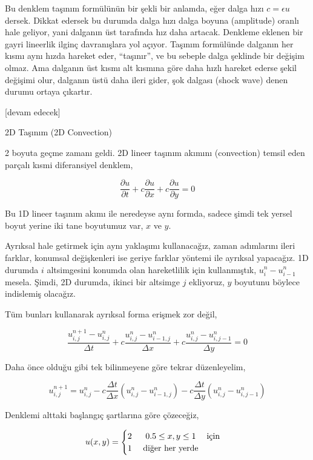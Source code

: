 \documentclass[12pt,fleqn]{article}\usepackage{../../common}
\begin{document}
Bu denklem taşınım formülünün bir şekli bir anlamda, eğer dalga hızı
$c = \epsilon u$ dersek. Dikkat edersek bu durumda dalga hızı dalga boyuna
(amplitude) oranlı hale geliyor, yani dalganın üst tarafında hız daha artacak.
Denkleme eklenen bir gayri lineerlik ilginç davranışlara yol açıyor. Taşınım
formülünde dalganın her kısmı aynı hızda hareket eder, ``taşınır'', ve bu
sebeple dalga şeklinde bir değişim olmaz. Ama dalganın üst kısmı alt kısmına
göre daha hızlı hareket ederse şekil değişimi olur, dalganın üstü daha ileri
gider, şok dalgası (shock wave) denen durumu ortaya çıkartır. 

[devam edecek]

2D Taşınım (2D Convection)

2 boyuta geçme zamanı geldi. 2D lineer taşınım akımını (convection) temsil eden
parçalı kısmi diferansiyel denklem,

$$
\frac{\partial u}{\partial t} +
c\frac{\partial u}{\partial x} +
c\frac{\partial  u}{\partial y} = 0
$$

Bu 1D lineer taşınım akımı ile neredeyse aynı formda, sadece şimdi tek yersel
boyut yerine iki tane boyutumuz var, $x$ ve $y$.

Ayrıksal hale getirmek için aynı yaklaşımı kullanacağız, zaman adımlarını ileri
farklar, konumsal değişkenleri ise geriye farklar yöntemi ile ayrıksal
yapacağız. 1D durumda $i$ altsimgesini konumda olan hareketlilik için
kullanmıştık,  $u_{i}^n-u_{i-1}^n$ mesela. Şimdi, 2D durumda, ikinci bir
altsimge $j$ ekliyoruz, $y$ boyutunu böylece indislemiş olacağız.

Tüm bunları kullanarak ayrıksal forma erişmek zor değil,

$$
\frac{u_{i,j}^{n+1}-u_{i,j}^n}{\Delta t} +
c\frac{u_{i, j}^n-u_{i-1,j}^n}{\Delta x} +
c\frac{u_{i,j}^n-u_{i,j-1}^n}{\Delta y}=0
$$

Daha önce olduğu gibi tek bilinmeyene göre tekrar düzenleyelim,

$$
u_{i,j}^{n+1} =
u_{i,j}^n-c \frac{\Delta t}{\Delta x}(u_{i,j}^n-u_{i-1,j}^n) -
c \frac{\Delta t}{\Delta y}(u_{i,j}^n-u_{i,j-1}^n)
$$

Denklemi alttaki başlangıç şartlarına göre çözeceğiz,

$$
u(x,y) = \begin{cases}
\begin{matrix}
2\ & 0.5 \leq x, y \leq 1   & \text{için}  \cr
1\ & \text{diğer her yerde}
\end{matrix}\end{cases}
$$
\end{document}
